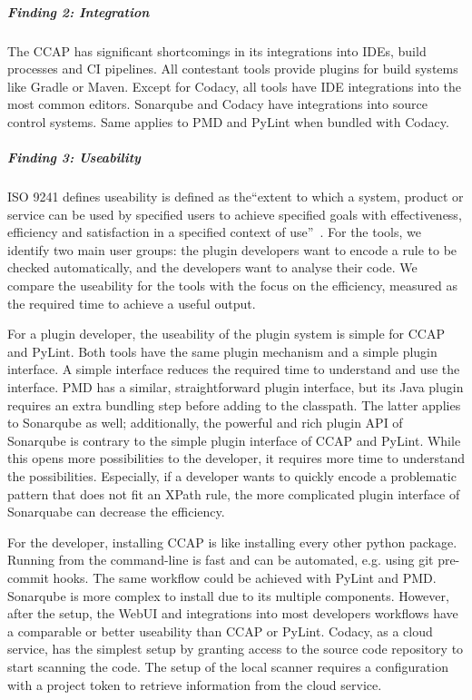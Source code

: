 \subparagraph{Finding 2: Integration}
The CCAP has significant shortcomings in its integrations into IDEs, build processes and CI pipelines. All contestant tools provide plugins for build systems like Gradle or Maven. Except for Codacy, all tools have IDE integrations into the most common editors. Sonarqube and Codacy have integrations into source control systems. Same applies to PMD and PyLint when bundled with Codacy.

\subparagraph{Finding 3: Useability}
ISO 9241 defines useability is defined as the\enquote{extent to which a system, product or service can be used by specified users to achieve specified goals with effectiveness, efficiency and satisfaction in a specified context of use}~\cite{isotc_159sc_4_iso_2018}. For the tools, we identify two main user groups: the plugin developers want to encode a rule to be checked automatically, and the developers want to analyse their code. We compare the useability for the tools with the focus on the efficiency, measured as the required time to achieve a useful output.

For a plugin developer, the useability of the plugin system is simple for CCAP and PyLint. Both tools have the same plugin mechanism and a simple plugin interface. A simple interface reduces the required time to understand and use the interface.
PMD has a similar, straightforward plugin interface, but its Java plugin requires an extra bundling step before adding to the classpath. The latter applies to Sonarqube as well; additionally, the powerful and rich plugin API of Sonarqube is contrary to the simple plugin interface of CCAP and PyLint. While this opens more possibilities to the developer, it requires more time to understand the possibilities. Especially, if a developer wants to quickly encode a problematic pattern that does not fit an XPath rule, the more complicated plugin interface of Sonarquabe can decrease the efficiency. 

For the developer, installing CCAP is like installing every other python package. Running from the command-line is fast and can be automated, e.g. using git pre-commit hooks. The same workflow could be achieved with PyLint and PMD. Sonarqube is more complex to install due to its multiple components. However, after the setup, the WebUI and integrations into most developers workflows have a comparable or better useability than CCAP or PyLint. Codacy, as a cloud service, has the simplest setup by granting access to the source code repository to start scanning the code. The setup of the local scanner requires a configuration with a project token to retrieve information from the cloud service.

